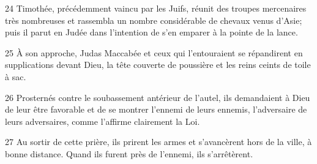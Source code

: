 24 Timothée, précédemment vaincu par les Juifs, réunit des troupes mercenaires très nombreuses et rassembla un nombre considérable de chevaux venus d’Asie; puis il parut en Judée dans l’intention de s’en emparer à la pointe de la lance.

25 À son approche, Judas Maccabée et ceux qui l’entouraient se répandirent en supplications devant Dieu, la tête couverte de poussière et les reins ceints de toile à sac.

26 Prosternés contre le soubassement antérieur de l’autel, ils demandaient à Dieu de leur être favorable et de se montrer l’ennemi de leurs ennemis, l’adversaire de leurs adversaires, comme l’affirme clairement la Loi.

27 Au sortir de cette prière, ils prirent les armes et s’avancèrent hors de la ville, à bonne distance. Quand ils furent près de l’ennemi, ils s’arrêtèrent.
